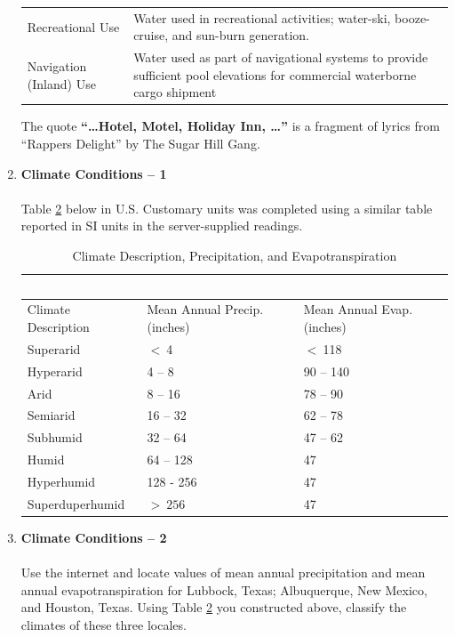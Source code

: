\documentclass[12pt]{article}
\begin{document}
\begin{enumerate}
\begin{table}[h!]
\begin{tabular}{p{1.7in}p{4.3in}}
Recreational Use & Water used in recreational activities; water-ski, booze-cruise, and sun-burn generation.  \\

Navigation (Inland) Use & Water used as part of navigational systems to provide sufficient pool elevations for commercial waterborne cargo shipment\\

\hline
\hline
   \end{tabular}
   \label{tab:water-use}
\end{table}
The quote \textbf{``\dots Hotel, Motel, Holiday Inn, \dots''} is a fragment of lyrics from ``Rappers Delight'' by The Sugar Hill Gang.
\clearpage
\item{{\textbf{Climate Conditions -- 1}}}~\\~\\
Table \ref{tab:climate} below in U.S. Customary units was completed using a similar table reported in SI units in the server-supplied readings.
\begin{table}[htbp]
   \centering
   \caption{Climate Description, Precipitation, and Evapotranspiration}
   \begin{tabular}{p{1.5in}p{2.25in}p{2.25in}} %
   ~ & ~ & ~\\
\hline \hline
Climate Description & Mean Annual Precip. (inches) & Mean Annual Evap. (inches) \\
\hline

   Superarid & $<~$4 & $<~$118 \\

   Hyperarid & 4 -- 8  &  90 -- 140  \\
  
   Arid & 8 -- 16 &  78 -- 90 \\

   Semiarid & 16 -- 32 & 62 -- 78 \\

   Subhumid & 32 -- 64 & 47 -- 62 \\

   Humid & 64 -- 128 & 47  \\

   Hyperhumid & 128 - 256 & 47 \\

   Superduperhumid & $>~256$ & 47 \\

\hline
\hline
   \end{tabular}
   \label{tab:climate}
\end{table}

\item{{\textbf{Climate Conditions -- 2}}}~\\~\\
Use the internet and locate values of mean annual precipitation and mean annual evapotranspiration for Lubbock, Texas; Albuquerque, New Mexico, and Houston, Texas.   Using Table \ref{tab:climate} you constructed above, classify the climates of these three locales.
\end{enumerate}
\end{document}
